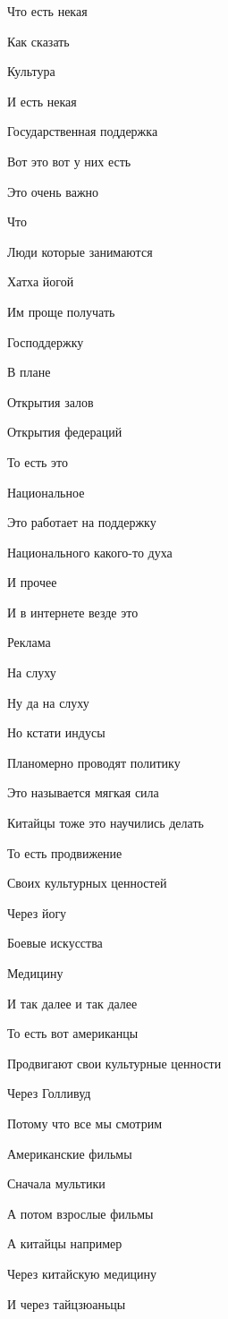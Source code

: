 Что есть некая

Как сказать

Культура

И есть некая

Государственная поддержка

Вот это вот у них есть

Это очень важно

Что

Люди которые занимаются

Хатха йогой

Им проще получать

Господдержку

В плане

Открытия залов

Открытия федераций

То есть это

Национальное

Это работает на поддержку

Национального какого-то духа

И прочее

И в интернете везде это

Реклама

На слуху

Ну да на слуху

Но кстати индусы

Планомерно проводят политику

Это называется мягкая сила

Китайцы тоже это научились делать

То есть продвижение

Своих культурных ценностей

Через йогу

Боевые искусства

Медицину

И так далее и так далее

То есть вот американцы

Продвигают свои культурные ценности

Через Голливуд

Потому что все мы смотрим

Американские фильмы

Сначала мультики

А потом взрослые фильмы

А китайцы например

Через китайскую медицину

И через тайцзюаньцы

